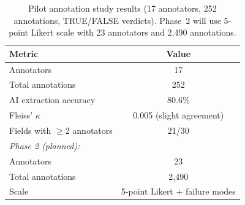 \begin{table}[t]
\centering
\caption{Pilot annotation study results (17 annotators, 252 annotations, TRUE/FALSE verdicts). Phase~2 will use 5-point Likert scale with 23 annotators and 2,490 annotations.}
\label{tab:annotation-study}
\begin{tabular}{lc}
\toprule
Metric & Value \\
\midrule
Annotators & 17 \\
Total annotations & 252 \\
AI extraction accuracy & 80.6\% \\
Fleiss' $\kappa$ & 0.005 (slight agreement) \\
Fields with $\geq$2 annotators & 21/30 \\
\midrule
\multicolumn{2}{l}{\textit{Phase 2 (planned):}} \\
Annotators & 23 \\
Total annotations & 2,490 \\
Scale & 5-point Likert + failure modes \\
\bottomrule
\end{tabular}
\end{table}




